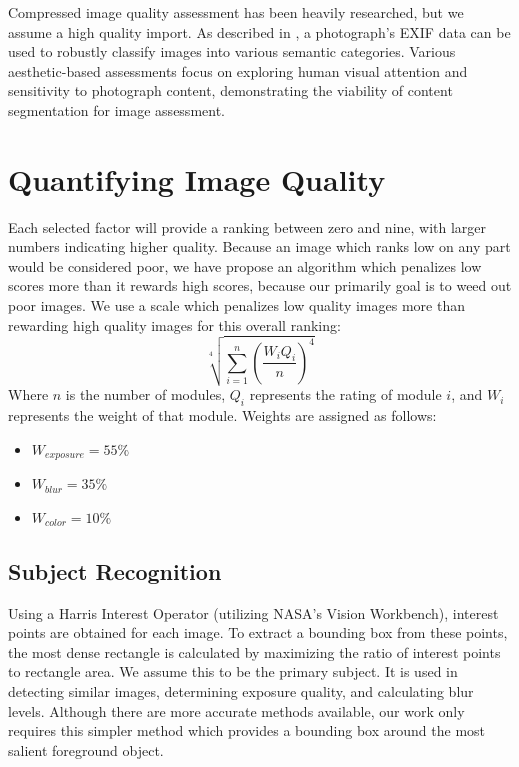 \documentclass{article}
\begin{document}
Compressed image quality assessment has been heavily researched\cite{477498}\cite{1038064}\cite{1284395}, but we assume a high quality import. As described in \cite{1315222}, a photograph's EXIF data can be used to robustly classify images into various semantic categories. Various aesthetic-based assessments focus on exploring human visual attention and sensitivity to photograph content\cite{Sun:2009:PAB:1631272.1631351}\cite{1518955}\cite{Pimenov_fastimage}, demonstrating the viability of content segmentation for image assessment.

\section{Quantifying Image Quality}
Each selected factor will provide a ranking between zero and nine, with larger numbers indicating higher quality. Because an image which ranks low on any part would be considered poor, we have propose an algorithm which penalizes low scores more than it rewards high scores, because our primarily goal is to weed out poor images. We use a scale which penalizes low quality images more than rewarding high quality images for this overall ranking:
\[
\sqrt[4]{\displaystyle\sum\limits_{i=1}^n(\frac{W_iQ_i}{n})^4}
\]
Where \(n\) is the number of modules, \(Q_i\) represents the rating of module \(i\), and \(W_i\) represents the weight of that module. Weights are assigned as follows:
\begin{itemize}
\item \(W_{exposure}=55\%\)
\item \(W_{blur}=35\%\)
\item \(W_{color}=10\%\)
\end{itemize}

\subsection{Subject Recognition}\label{ContentRecognition}
Using a Harris Interest Operator (utilizing NASA's Vision Workbench\cite{vision-workbench}), interest points are obtained for each image. To extract a bounding box from these points, the most dense rectangle is calculated by maximizing the ratio of interest points to rectangle area. We assume this to be the primary subject. It is used in detecting similar images, determining exposure quality, and calculating blur levels. Although there are more accurate methods available\cite{5649226}, our work only requires this simpler method which provides a bounding box around the most salient foreground object.
\end{document}
